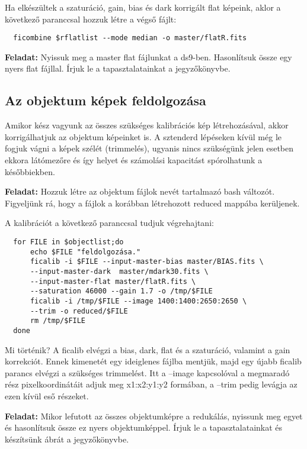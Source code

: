 \documentclass{article}
\begin{document}
Ha elkészültek a szaturáció, gain, bias és dark korrigált flat képeink, aklor a
következő paranccsal hozzuk létre a végső fájlt:

\begin{verbatim}
  ficombine $rflatlist --mode median -o master/flatR.fits
\end{verbatim}

{\bf Feladat:}
Nyissuk meg a master flat fájlunkat a ds9-ben. Hasonlítsuk össze egy nyers flat
fájllal. Írjuk le a tapasztalatainkat a jegyzőkönyvbe.


\subsection{Az objektum képek feldolgozása}

Amikor kész vagyunk az összes szükséges kalibrációs kép létrehozásával, akkor
korrigálhatjuk az objektum képeinket is. A sztenderd lépéseken kívül még le
fogjuk vágni a képek szélét (trimmelés), ugyanis nincs szükségünk jelen esetben
ekkora látómezőre és így helyet és számolási kapacitást spórolhatunk a
későbbiekben.

{\bf Feladat:}
Hozzuk létre az objektum fájlok nevét tartalmazó bash változót. Figyeljünk rá,
hogy a fájlok a korábban létrehozott reduced mappába kerüljenek.

A kalibrációt a következő paranccsal tudjuk végrehajtani:

\begin{verbatim}
  for FILE in $objectlist;do
      echo $FILE "feldolgozása."
      ficalib -i $FILE --input-master-bias master/BIAS.fits \
      --input-master-dark  master/mdark30.fits \
      --input-master-flat master/flatR.fits \
      --saturation 46000 --gain 1.7 -o /tmp/$FILE
      ficalib -i /tmp/$FILE --image 1400:1400:2650:2650 \
      --trim -o reduced/$FILE
      rm /tmp/$FILE
  done
\end{verbatim}

Mi történik? A ficalib elvégzi a bias, dark, flat és a szaturáció, valamint a
gain korrekciót. Ennek kimenetét egy ideiglenes fájlba mentjük, majd egy újabb
ficalib parancs elvégzi a szükséges trimmelést. Itt a --image kapcsolóval a
megmaradó rész pixelkoordinátáit adjuk meg x1:x2:y1:y2 formában, a --trim pedig
levágja az  ezen kívül eső részeket.

{\bf Feladat:}
Mikor lefutott az összes objektumképre a redukálás, nyissunk meg egyet és
hasonlítsuk össze ez nyers objektumképpel. Írjuk le a tapasztalatainkat és
készítsünk ábrát a jegyzőkönyvbe.
\end{document}
